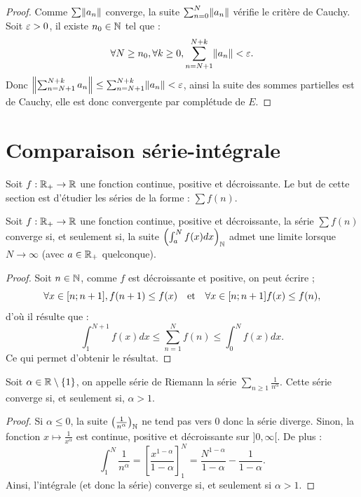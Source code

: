 \documentclass[french]{article}
\begin{document}
\begin{proof}
Comme $\sum \norm{a_n}$ converge, la suite $\sum_{n=0}^{N} \norm{a_n}$ vérifie le critère de Cauchy. 
Soit $\veps >0$, il existe $n_0 \in \N$ tel que :
\[ \forall N \geq n_0, \forall k \geq 0, \sum_{n=N+1}^{N+k} \norm{a_n} < \veps . \]
Donc $\norm*{\sum_{n=N+1}^{N+k} {a_n}} \leq \sum_{n=N+1}^{N+k} \norm{a_n} < \veps$, ainsi la suite des sommes partielles 
est de Cauchy, elle est donc convergente par complétude de $E$.
\end{proof}

\section{Comparaison série-intégrale}

Soit $f : \Rp \to \R$ une fonction continue, positive et décroissante. Le but de cette section est d'étudier les séries de la forme :
$\sum f(n)$.

\begin{thm}
Soit $f : \Rp \to \R$ une fonction continue, positive et décroissante, la série $\sum f(n)$ converge si, et seulement si, la suite 
$\Bigpar{\int_{a}^N f(x) dx}_\N$ admet une limite lorsque $N \to \infty$ (avec $a \in \Rp$ quelconque).
\end{thm}

\begin{proof}
Soit $n \in \N$, comme $f$ est décroissante et positive, on peut écrire ;
\[ \forall x \in [n ; n+1], f(n+1) \leq f(x) \et \forall x \in [n ; n+1] f(x) \leq f(n) , \]
d'où il résulte que :
\[ \int_1^{N+1} f(x) dx \leq \sum_{n=1}^N f(n) \leq \int_0^{N} f(x) dx . \]
Ce qui permet d'obtenir le résultat.
\end{proof}

\begin{coro}
Soit $\alpha \in \R \setminus \{1\}$, on appelle série de Riemann la série $\sum_{n \geq 1} \frac{1}{n^{\alpha}}$.
Cette série converge si, et seulement si, $\alpha > 1$.
\end{coro}

\begin{proof}
Si $\alpha \leq 0$, la suite $\bigpar{\frac{1}{n^{\alpha}}}_\N$ ne tend pas vers 0 donc la série diverge.
Sinon, la fonction $x \mapsto \frac{1}{x^{\alpha}}$ est continue, positive et décroissante sur $]0, \infty[$. De plus :
\[ \int_1^N \dfrac{1}{n^{\alpha}} = \left [ \dfrac{x^{1-\alpha}}{1-\alpha} \right ]_1^N = \dfrac{N^{1-\alpha}}{1-\alpha} - \dfrac{1}{1-\alpha} . \]
Ainsi, l'intégrale (et donc la série) converge si, et seulement si $\alpha > 1$.
\end{proof}
\end{document}

